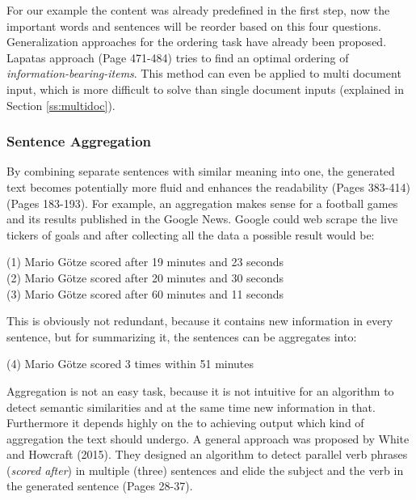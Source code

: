 For our example the content was already predefined in the first step, now the important words and sentences will be reorder based on this four questions. Generalization approaches for the ordering task have already been proposed. Lapatas approach \cite{lapata} (Page 471-484) tries to find an optimal ordering of \textit{information-bearing-items}. This method can even be applied to multi document input, which is more difficult to solve than single document inputs (explained in Section \ref{ss:multidoc}).

\subsubsection{Sentence Aggregation}

By combining separate sentences with similar meaning into one, the generated text becomes potentially more fluid and enhances the readability \cite{dal} (Pages 383-414) \cite{cheng-mellish2000} (Pages 183-193). For example, an aggregation makes sense for a football games and its results published in the Google News. Google could web scrape the live tickers of goals and after collecting all the data a possible result would be:

\begin{tcolorbox}
	\begin{center}
		(1) Mario Götze scored after 19 minutes and 23 seconds \\
		(2) Mario Götze scored after 20 minutes and 30 seconds \\
		(3) Mario Götze scored after 60 minutes and 11 seconds
	\end{center}
\end{tcolorbox}

This is obviously not redundant, because it contains new information in every sentence, but for summarizing it, the sentences can be aggregates into:

\begin{tcolorbox}
	\begin{center}
		(4) Mario Götze scored 3 times within 51 minutes
	\end{center}
\end{tcolorbox}

Aggregation is not an easy task, because it is not intuitive for an algorithm to detect semantic similarities and at the same time new information in that. Furthermore it depends highly on the to achieving output which kind of aggregation the text should undergo. A general approach was proposed by White and Howcraft (2015). They designed an algorithm to detect parallel verb phrases (\textit{scored after}) in multiple (three) sentences and elide the subject and the verb in the generated sentence \cite{white-howcroft-2015-inducing} (Pages 28-37). 

